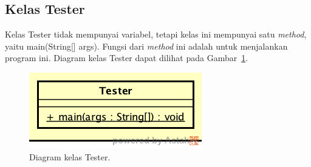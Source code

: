 \subsection{Kelas Tester}
\label{sec:kelastester}

Kelas Tester tidak mempunyai variabel, tetapi kelas ini mempunyai satu \textit{method}, yaitu main(String[] args). Fungsi dari \textit{method} ini adalah untuk menjalankan program ini. Diagram kelas Tester dapat dilihat pada Gambar~\ref{fig:diagramkelastester}.

\begin{figure}
\centering
\captionsetup{justification=centering}
\includegraphics[scale=0.5]{Gambar/Perancangan/DiagramKelasTester.png}
\caption[Diagram kelas Tester.]{Diagram kelas Tester.}
\label{fig:diagramkelastester}
\end{figure}